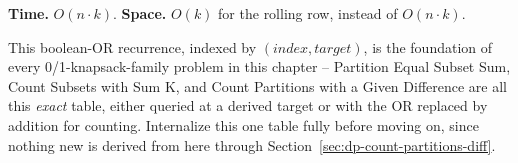 \begin{complexitybox}
\textbf{Time.} $O(n \cdot k)$.
\textbf{Space.} $O(k)$ for the rolling row, instead of $O(n \cdot k)$.
\end{complexitybox}

\begin{takeawaybox}
This boolean-OR recurrence, indexed by $(\textit{index},
\textit{target})$, is the foundation of every 0/1-knapsack-family
problem in this chapter -- Partition Equal Subset Sum, Count Subsets
with Sum K, and Count Partitions with a Given Difference are all this
\emph{exact} table, either queried at a derived target or with the OR
replaced by addition for counting. Internalize this one table fully
before moving on, since nothing new is derived from here through
Section~\ref{sec:dp-count-partitions-diff}.
\end{takeawaybox}

